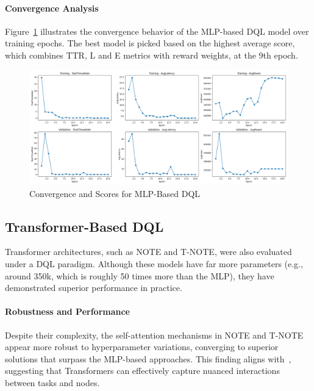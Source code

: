 \documentclass[preprint,3p,authoryear]{elsarticle}
\begin{document}
\paragraph{Convergence Analysis}

Figure~\ref{fig:mlp-score-plot} illustrates the convergence behavior of the MLP-based DQL model over training epochs. The best model is picked based on the highest average score, which combines TTR, L and E metrics with reward weights, at the 9th epoch. 

\begin{figure}[H]
    \centering
    \includegraphics[width=1\linewidth]{figs/MLP/score_plot.png}
    \caption{Convergence and Scores for MLP-Based DQL}\label{fig:mlp-score-plot}
\end{figure}




\subsection{Transformer-Based DQL}\label{subsec:transformer_perf}

Transformer architectures, such as NOTE and T-NOTE, were also evaluated under a DQL paradigm. Although these models have far more parameters (e.g., around 350k, which is roughly 50 times more than the MLP), they have demonstrated superior performance in practice. 

\paragraph{Robustness and Performance}
Despite their complexity, the self-attention mechanisms in NOTE and T-NOTE appear more robust to hyperparameter variations, converging to superior solutions that surpass the MLP-based approaches. This finding aligns with~\cite{gholipour_tpto_2023}, suggesting that Transformers can effectively capture nuanced interactions between tasks and nodes. 
\end{document}

